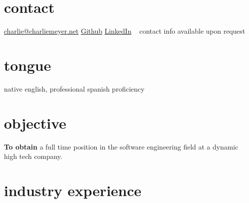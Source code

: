 \documentclass{friggeri-cv} %
\begin{document}


\begin{aside} %
\section{contact}
\href{mailto:charlie@charliemeyer.net}{charlie@charliemeyer.net}
\href{https://www.github.com/cemeyer2}{Github}
\href{www.linkedin.com/in/cemeyer2}{LinkedIn}
~
contact info available upon request
~
\section{tongue}
native english,
professional spanish proficiency
\end{aside}

\section{objective}

\textbf{To obtain} a full time position in the software engineering field at a dynamic high tech company.

\section{industry experience}
\end{document}
